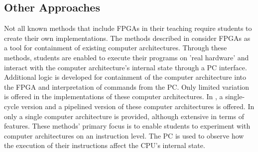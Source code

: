 \documentclass[openright]{template/uva-bachelor-thesis}
\begin{document}




\subsection{Other Approaches}

Not all known methods that include FPGAs in their teaching require students to create their own implementations. The methods described in \cite{holland2003harnessing, bulic2013fpga, mipsfpga} consider FPGAs as a tool for containment of existing computer architectures. Through these methods, students are enabled to execute their programs on 'real hardware' and interact with the computer architecture's internal state through a PC interface. Additional logic is developed for containment of the computer architecture into the FPGA and interpretation of commands from the PC. Only limited variation is offered in the implementations of these computer architectures. In \cite{holland2003harnessing, bulic2013fpga}, a single-cycle version and a pipelined version of these computer architectures is offered. In \cite{mipsfpga} only a single computer architecture is provided, although extensive in terms of features. These methods' primary focus is to enable students to experiment with computer architectures on an instruction level. The PC is used to observe how the execution of their instructions affect the CPU's internal state.
\end{document}
